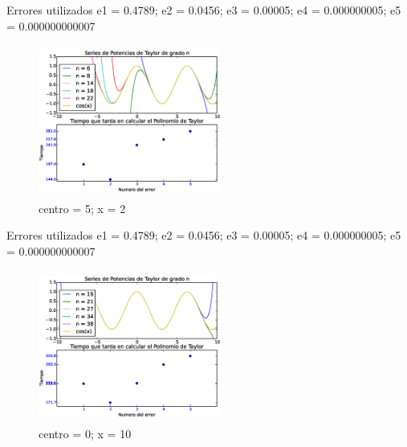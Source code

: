 \documentclass{beamer}
\begin{document}
\begin{frame}
Errores utilizados e1 = 0.4789; e2 = 0.0456; e3 = 0.00005; e4 = 0.000000005; e5 = 0.000000000007
\begin{figure}[!th]
\begin{center}\includegraphics[height=5cm, width=6cm]{images/Graficascentro5.eps}
\caption{centro = 5; x = 2}
\label{cos}
\end{center}
\end{figure}

\end{frame}  

\begin{frame}
Errores utilizados e1 = 0.4789; e2 = 0.0456; e3 = 0.00005; e4 = 0.000000005; e5 = 0.000000000007
\begin{figure}[!th]
\begin{center}\includegraphics[height=5cm, width=6cm]{images/Graficas10.eps}
\caption{centro = 0; x = 10}
\label{cos}
\end{center}
\end{figure} 

\end{frame}  



\end{document}
